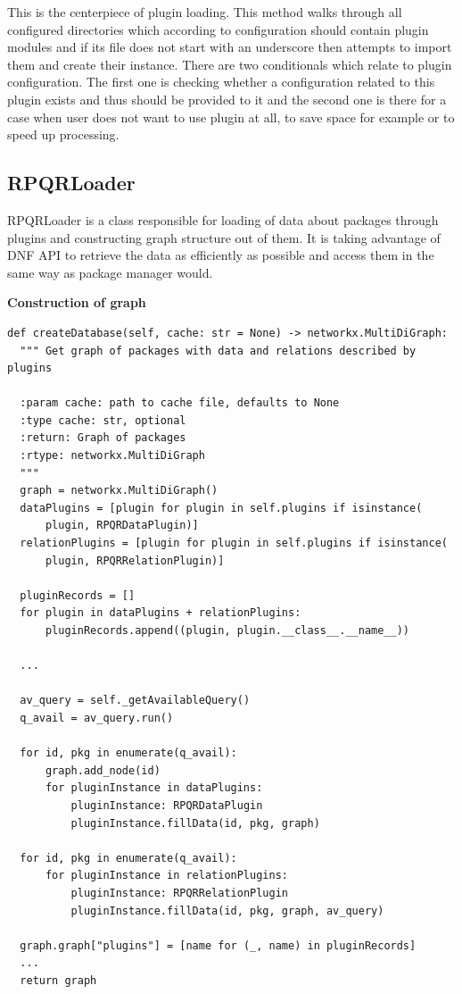 This is the centerpiece of plugin loading. This method walks through all configured directories
which according to configuration should contain plugin modules and if its file does not start with
an underscore then attempts to import them and create their instance. There are two conditionals
which relate to plugin configuration. The first one is checking whether a configuration related to
this plugin exists and thus should be provided to it and the second one is there for a case when
user does not want to use plugin at all, to save space for example or to speed up processing.

\subsection*{RPQRLoader}
RPQRLoader is a class responsible for loading of data about packages through plugins and constructing
graph structure out of them. It is taking advantage of DNF API to retrieve the data as efficiently as
possible and access them in the same way as package manager would.

\newpage

\textbf{Construction of graph}

\begin{lstlisting}
def createDatabase(self, cache: str = None) -> networkx.MultiDiGraph:
  """ Get graph of packages with data and relations described by plugins

  :param cache: path to cache file, defaults to None
  :type cache: str, optional
  :return: Graph of packages
  :rtype: networkx.MultiDiGraph
  """
  graph = networkx.MultiDiGraph()
  dataPlugins = [plugin for plugin in self.plugins if isinstance(
      plugin, RPQRDataPlugin)]
  relationPlugins = [plugin for plugin in self.plugins if isinstance(
      plugin, RPQRRelationPlugin)]

  pluginRecords = []
  for plugin in dataPlugins + relationPlugins:
      pluginRecords.append((plugin, plugin.__class__.__name__))

  ...

  av_query = self._getAvailableQuery()
  q_avail = av_query.run()

  for id, pkg in enumerate(q_avail):
      graph.add_node(id)
      for pluginInstance in dataPlugins:
          pluginInstance: RPQRDataPlugin
          pluginInstance.fillData(id, pkg, graph)

  for id, pkg in enumerate(q_avail):
      for pluginInstance in relationPlugins:
          pluginInstance: RPQRRelationPlugin
          pluginInstance.fillData(id, pkg, graph, av_query)

  graph.graph["plugins"] = [name for (_, name) in pluginRecords]
  ...
  return graph
\end{lstlisting}

